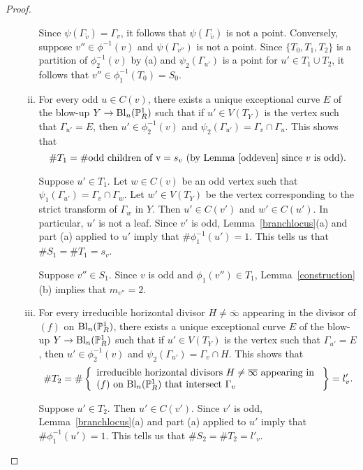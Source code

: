 \begin{proof}
\begin{enumerate}[\upshape (a)]
\begin{enumerate}[(i)]
  Since $\psi(\Gamma_{\tilde{v}}) = \Gamma_v$, it follows that $\psi(\Gamma_{\tilde{v}})$ is not a point. Conversely, suppose $v'' \in \phi^{-1}(v)$ and $\psi(\Gamma_{v''})$ is not a point.  Since $\{ T_0,T_1,T_2 \}$ is a partition of $\phi_2^{-1}(v)$ by (a) and $\psi_2(\Gamma_{u'})$ is a point for $u' \in T_1 \cup T_2$, it follows that $v'' \in \phi_1^{-1}(T_0) = S_0$.
  
  \item For every odd $u \in C(v)$, there exists a unique exceptional curve $E$ of the blow-up $Y \rightarrow \mathrm{Bl}_n(\P^1_R)$ such that if $u' \in V(T_Y)$ is the vertex such that $\Gamma_{u'} = E$, then $u' \in \phi_2^{-1}(v)$ and $\psi_2(\Gamma_{u'}) = \Gamma_v \cap \Gamma_u$. This shows that 
  \[ \# T_1 = \# \textup{odd children of v} = s_v \ (\textup{by Lemma~\ref{oddeven} since $v$ is odd}) . \]
  
  Suppose $u' \in T_1$. Let $w \in C(v)$ be an odd vertex such that $\psi_1(\Gamma_{u'}) = \Gamma_v \cap \Gamma_w$. Let $w' \in V(T_Y)$ be the vertex corresponding to the strict transform of $\Gamma_{w}$ in $Y$.  Then $u' \in C(v')$ and $w' \in C(u')$. In particular, $u'$ is not a leaf. Since $v'$ is odd, Lemma~\ref{branchlocus}(a) and part (a) applied to $u'$ imply that $\# \phi_1^{-1}(u') = 1$. This tells us that $\# S_1 = \# T_1 = s_v$. 
  
  Suppose $v'' \in S_1$. Since $v$ is odd and $\phi_1(v'') \in T_1$, Lemma~\ref{construction}(b) implies that $m_{v''} = 2$.
  
  \item For every irreducible horizontal divisor $H \neq \overline{\infty}$ appearing in the divisor of $(f)$ on $\mathrm{Bl}_n(\P^1_R)$, there exists a unique exceptional curve $E$ of the blow-up $Y \rightarrow \mathrm{Bl}_n(\P^1_R)$ such that if $u' \in V(T_Y)$ is the vertex such that $\Gamma_{u'} = E$, then $u' \in \phi_2^{-1}(v)$ and $\psi_2(\Gamma_{u'}) = \Gamma_v \cap H$. This shows that
  \[ \# T_2 = \# \left\{ \begin{array}{l} \textup{irreducible horizontal divisors $H \neq \overline{\infty}$  appearing in } \\ \textup{$(f)$ on $\mathrm{Bl}_n(\P^1_R)$ that intersect $\Gamma_v$} \end{array} \right\} = l'_v . \]
  
  Suppose $u' \in T_2$. Then $u' \in C(v')$. Since $v'$ is odd, Lemma~\ref{branchlocus}(a) and part (a) applied to $u'$ imply that $\# \phi_1^{-1}(u') = 1$. This tells us that $\# S_2 = \# T_2 = l'_v$. 
  

\end{enumerate}
\end{enumerate}
\end{proof}
